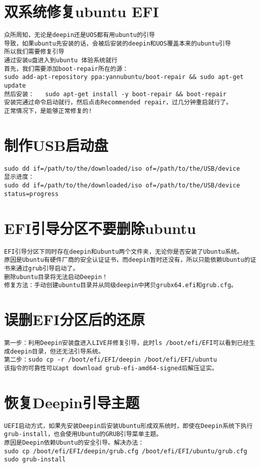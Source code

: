 \documentclass[a4paper,fontset=fandol,zihao=-4,linespread=1.2,oneside]{ctexbook}
\begin{document}
\section{双系统修复ubuntu EFI}
\begin{lstlisting}
众所周知，无论是deepin还是UOS都有用ubuntu的引导
导致，如果ubuntu先安装的话，会被后安装的deepin和UOS覆盖本来的ubuntu引导
所以我们需要修复引导
通过安装u盘进入到ubuntu 体验系统就行
首先，我们需要添加boot-repair所在的源：
sudo add-apt-repository ppa:yannubuntu/boot-repair && sudo apt-get update
然后安装：   sudo apt-get install -y boot-repair && boot-repair
安装完通过命令启动就行，然后点击Recommended repair，过几分钟重启就行了。
正常情况下，是能够正常修复的!
\end{lstlisting}

\section{制作USB启动盘}
\begin{lstlisting}
sudo dd if=/path/to/the/downloaded/iso of=/path/to/the/USB/device
显示进度：
sudo dd if=/path/to/the/downloaded/iso of=/path/to/the/USB/device status=progress
\end{lstlisting}

\section{EFI引导分区不要删除ubuntu}
\begin{lstlisting}
EFI引导分区下同时存在deepin和ubuntu两个文件夹，无论你是否安装了Ubuntu系统。
原因是Ubuntu有硬件厂商的安全认证证书，而deepin暂时还没有，所以只能依赖Ubuntu的证书来通过grub引导启动了。
删除ubuntu目录将无法启动Deepin！
修复方法：手动创建ubuntu目录并从同级deepin中拷贝grubx64.efi和grub.cfg。
\end{lstlisting}

\section{误删EFI分区后的还原}
\begin{lstlisting}
第一步：利用Deepin安装盘进入LIVE并修复引导，此时ls /boot/efi/EFI可以看到已经生成deepin目录，但还无法引导系统。
第二步：sudo cp -r /boot/efi/EFI/deepin /boot/efi/EFI/ubuntu
该指令的可靠性可以apt download grub-efi-amd64-signed后解压证实。
\end{lstlisting}

\section{恢复Deepin引导主题}
\begin{lstlisting}
UEFI启动方式，如果先安装Deepin后安装Ubuntu形成双系统时，即使在Deepin系统下执行grub-install，也会使用Ubuntu的GRUB引导菜单主题。
原因是Deepin依赖Ubuntu的安全引导。解决办法：
sudo cp /boot/efi/EFI/deepin/grub.cfg /boot/efi/EFI/ubuntu/grub.cfg
sudo grub-install
\end{lstlisting}
\end{document}
